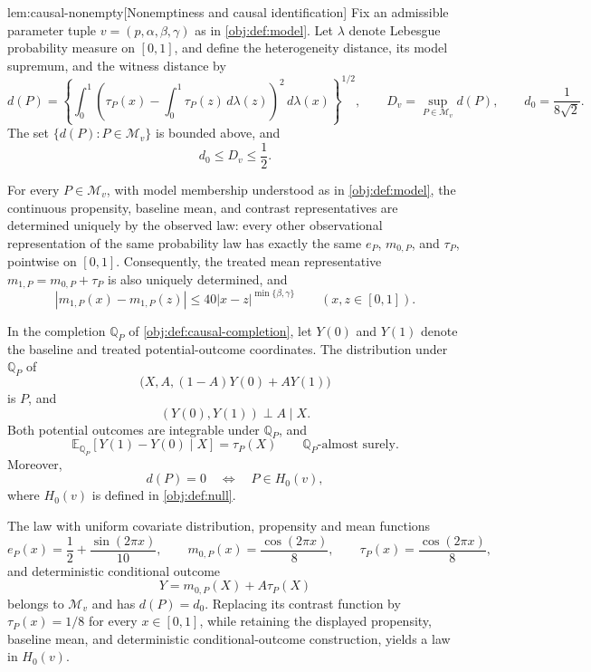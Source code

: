 \documentclass[11pt]{article}
\begin{document}
\begin{lemmav}{lem:causal-nonempty}[Nonemptiness and causal identification]
Fix an admissible parameter tuple \(v=(p,\alpha,\beta,\gamma)\) as in \cref{obj:def:model}. Let \(\lambda\) denote Lebesgue probability measure on \([0,1]\), and define the heterogeneity distance, its model supremum, and the witness distance by
\[
d(P)=
\left\{\int_0^1
\left(\tau_P(x)-\int_0^1\tau_P(z)\,d\lambda(z)\right)^2
\,d\lambda(x)\right\}^{1/2},
\qquad
D_v=\sup_{P\in\mathcal M_v}d(P),
\qquad
d_0=\frac{1}{8\sqrt{2}}.
\]
The set \(\{d(P):P\in\mathcal M_v\}\) is bounded above, and
\[
d_0\le D_v\le\frac12.
\]

For every \(P\in\mathcal M_v\), with model membership understood as in \cref{obj:def:model}, the continuous propensity, baseline mean, and contrast representatives are determined uniquely by the observed law: every other observational representation of the same probability law has exactly the same \(e_P\), \(m_{0,P}\), and \(\tau_P\), pointwise on \([0,1]\). Consequently, the treated mean representative \(m_{1,P}=m_{0,P}+\tau_P\) is also uniquely determined, and
\[
|m_{1,P}(x)-m_{1,P}(z)|
\le 40|x-z|^{\min\{\beta,\gamma\}}
\qquad (x,z\in[0,1]).
\]

In the completion \(\mathbb Q_P\) of \cref{obj:def:causal-completion}, let \(Y(0)\) and \(Y(1)\) denote the baseline and treated potential-outcome coordinates. The distribution under \(\mathbb Q_P\) of
\[
\bigl(X,A,(1-A)Y(0)+AY(1)\bigr)
\]
is \(P\), and
\[
(Y(0),Y(1))\perp A\mid X.
\]
Both potential outcomes are integrable under \(\mathbb Q_P\), and
\[
\mathbb E_{\mathbb Q_P}\!\left[Y(1)-Y(0)\mid X\right]
=\tau_P(X)
\qquad \mathbb Q_P\text{-almost surely}.
\]
Moreover,
\[
d(P)=0\quad\Longleftrightarrow\quad P\in H_0(v),
\]
where \(H_0(v)\) is defined in \cref{obj:def:null}.

The law with uniform covariate distribution, propensity and mean functions
\[
e_P(x)=\frac12+\frac{\sin(2\pi x)}{10},
\qquad
m_{0,P}(x)=\frac{\cos(2\pi x)}8,
\qquad
\tau_P(x)=\frac{\cos(2\pi x)}8,
\]
and deterministic conditional outcome
\[
Y=m_{0,P}(X)+A\tau_P(X)
\]
belongs to \(\mathcal M_v\) and has \(d(P)=d_0\). Replacing its contrast function by \(\tau_P(x)=1/8\) for every \(x\in[0,1]\), while retaining the displayed propensity, baseline mean, and deterministic conditional-outcome construction, yields a law in \(H_0(v)\).
\end{lemmav}
\end{document}

